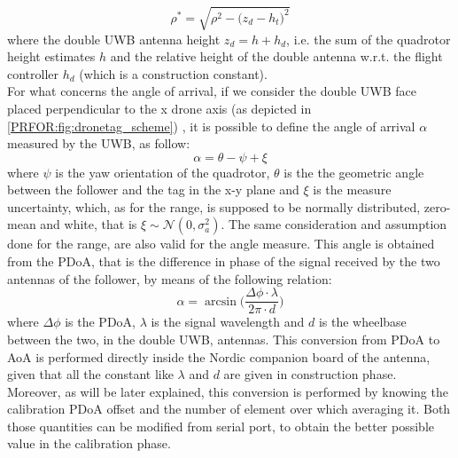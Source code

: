 \begin{equation}
    \rho^* = \sqrt{\rho^2 - \big( z_d - h_t\big)^2}
\end{equation}
where the double UWB antenna height $z_d = h + h_d$, i.e. the sum of the quadrotor height estimates $h$ and the relative height of the double antenna w.r.t. the flight controller $h_d$ (which is a construction constant).\\

For what concerns the angle of arrival, if we consider the double UWB face placed perpendicular to the x drone axis (as depicted in \autoref{PRFOR:fig:dronetag_scheme}) , it is possible to define the angle of arrival \textbf{$\alpha$} measured by the UWB, as follow:
\begin{equation}
    \alpha = \theta -\psi+ \xi
\end{equation}
where $\psi$ is the yaw orientation of the quadrotor, $\theta$ is the the geometric angle between the follower and the tag in the x-y plane and $\xi$ is the measure uncertainty, which, as for the range, is supposed to be normally distributed, zero-mean and white, that is $\xi \sim \mathcal{N}(0,\sigma_a^2)$. The same consideration and assumption done for the range, are also valid for the angle measure. This angle is obtained from the PDoA, that is the difference in phase of the signal received by the two antennas of the follower, by means of the following relation:
\begin{equation}\label{PRFOR:eq:aoa-pdod}
    \alpha = \arcsin \Bigg( \frac{\Delta\phi \cdot \lambda}{2\pi\cdot d} \Bigg)
\end{equation}
where $\Delta\phi$ is the PDoA, $\lambda$ is the signal wavelength and $d$ is the wheelbase between the two, in the double UWB, antennas. This conversion from PDoA to AoA is performed directly inside the Nordic companion board of the antenna, given that all the constant like $\lambda$ and $d$ are given in construction phase. Moreover, as will be later explained, this conversion is performed by knowing the calibration PDoA offset and the number of element over which averaging it. Both those quantities can be modified from serial port, to obtain the better possible value in the calibration phase.

